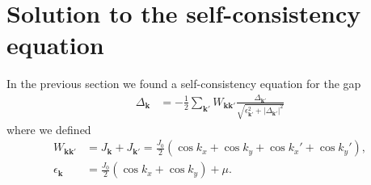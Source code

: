 \documentclass[english, parskip=full]{scrartcl}
\newcommand{\kla}{}
\newcommand{\klam}{}
\begin{document}
\section{Solution to the self-consistency equation}
In the previous section we found a self-consistency equation for the gap
\begin{align}
\Delta_{\mathbf{k}} &= -\frac{1}{2}\sum_{\mathbf{k}'} W_{\mathbf{k}\textbf{k}'} \frac{\Delta_{\mathbf{k}'}}{\sqrt{\epsilon_{\mathbf{k}'}^2 + |\Delta_{\mathbf{k}'}|^2}}
\end{align}   
where we defined
\begin{align}
W_{\textbf{k}\textbf{k}'} &= J_\textbf{k} + J_{\textbf{k}'} = \frac{J_0}{2} \kla\left( \cos k_x + \cos k_y + \cos k_x' + \cos k_y' \right),\\
\epsilon_\textbf{k} &= \frac{J_0}{2} \kla\left( \cos k_x + \cos k_y \right) + \mu.
\end{align}
\end{document}
